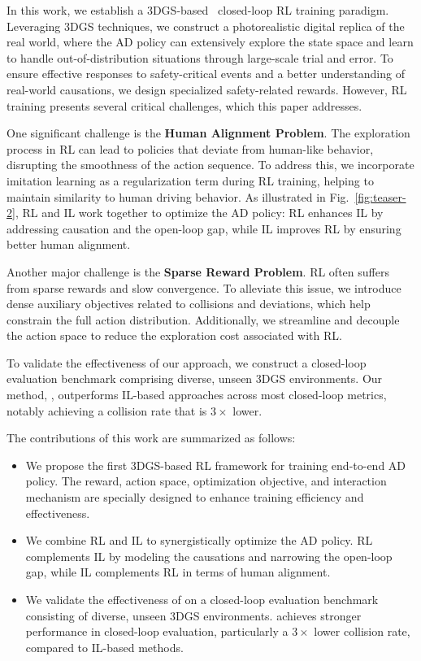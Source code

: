 In this work, we establish a 3DGS-based~\cite{3dgs} closed-loop RL training paradigm.  
Leveraging 3DGS techniques, we construct a photorealistic digital replica of the real world,  
where the AD policy can extensively explore the state space and learn to handle out-of-distribution situations  
through large-scale trial and error. To ensure effective responses to safety-critical events  
and a better understanding of real-world causations, we design specialized safety-related rewards.  
However, RL training presents several critical challenges, which this paper addresses.  

One significant challenge is the \textbf{Human Alignment Problem}.  
The exploration process in RL can lead to policies that deviate from human-like behavior,  
disrupting the smoothness of the action sequence.  
To address this, we incorporate imitation learning as a regularization term during RL training,  
helping to maintain similarity to human driving behavior.  
As illustrated in Fig.~\ref{fig:teaser-2}, RL and IL work together to optimize the AD policy:  
RL enhances IL by addressing causation and the open-loop gap, while IL improves RL by ensuring better human alignment.  

Another major challenge is the \textbf{Sparse Reward Problem}.  
RL often suffers from sparse rewards and slow convergence.  
To alleviate this issue, we introduce dense auxiliary objectives related to collisions and deviations,  
which help constrain the full action distribution.  
Additionally, we streamline and decouple the action space to reduce the exploration cost associated with RL.  

To validate the effectiveness of our approach, we construct a closed-loop evaluation benchmark comprising diverse, unseen 3DGS environments. Our method, \texttt{\thename}, outperforms IL-based approaches across most closed-loop metrics, notably achieving a collision rate that is $3\times$ lower.

The contributions of this work are summarized as follows:
\begin{itemize}
    \item We propose the first 3DGS-based RL framework for training end-to-end AD policy. The reward, action space, optimization objective, and interaction mechanism are specially designed to enhance training efficiency and effectiveness.
    \item We combine RL and IL to synergistically optimize the AD policy. RL complements IL by modeling the causations and narrowing the open-loop gap, while IL complements RL in terms of human alignment.
    \item We validate the effectiveness of \thename{} on a closed-loop evaluation benchmark consisting of diverse, unseen 3DGS environments. \thename{} achieves stronger performance in closed-loop evaluation, particularly a $3\times$ lower collision rate, compared to IL-based methods.
\end{itemize}
